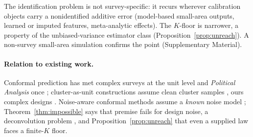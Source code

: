 \begin{remark}\label{rem:general}
The identification problem is not survey-specific: it recurs wherever
calibration objects carry a nonidentified additive error (model-based
small-area outputs, learned or imputed features, meta-analytic effects). The
$K$-floor is narrower, a property of the unbiased-variance estimator class
(Proposition~\ref{prop:unreach}). A non-survey small-area simulation
confirms the point (Supplementary Material).
\end{remark}

\paragraph{Relation to existing work.} Conformal prediction has met complex
surveys at the unit level \citep{wieczorek2023design} and \emph{Political
Analysis} once \citep{randahl2026bin}; cluster-as-unit
constructions assume clean cluster samples
\citep{dunn2023distribution,lee2023distribution}, ours complex designs
\citep{binder1983variances,lumley2010complex}.
Noise-aware conformal methods assume a \emph{known} noise model
\citep{einbinder2024label,sesia2025adaptive,singer2025conformal};
Theorem~\ref{thm:impossible} says that premise fails for design noise, a
deconvolution problem \citep{fan1991optimal}, and
Proposition~\ref{prop:unreach} that even a supplied law faces a finite-$K$
floor.
